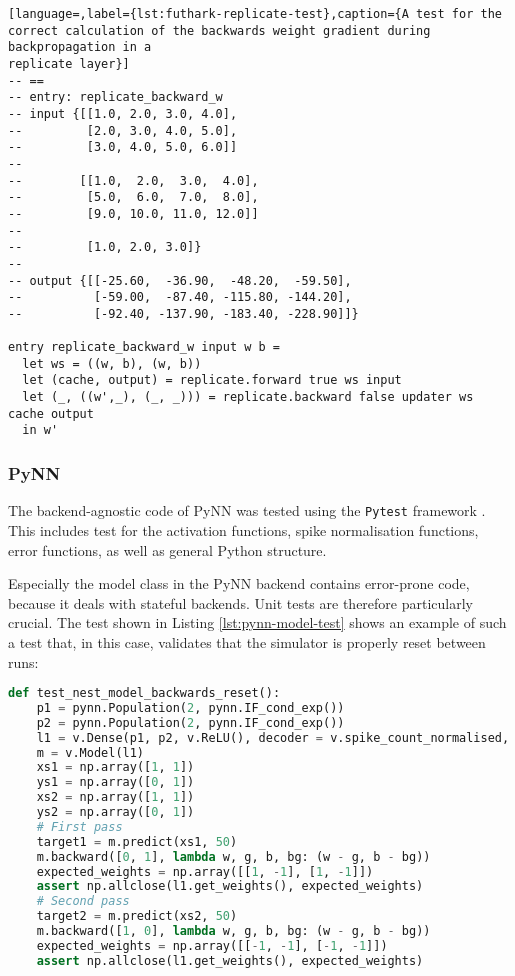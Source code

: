 \begin{minipage}{\linewidth}
\begin{lstlisting}[language=,label={lst:futhark-replicate-test},caption={A test for the
correct calculation of the backwards weight gradient during backpropagation in a
replicate layer}]
-- ==
-- entry: replicate_backward_w
-- input {[[1.0, 2.0, 3.0, 4.0],
--         [2.0, 3.0, 4.0, 5.0],
--         [3.0, 4.0, 5.0, 6.0]]
--
--        [[1.0,  2.0,  3.0,  4.0],
--         [5.0,  6.0,  7.0,  8.0],
--         [9.0, 10.0, 11.0, 12.0]]
--
--         [1.0, 2.0, 3.0]}
--
-- output {[[-25.60,  -36.90,  -48.20,  -59.50],
--          [-59.00,  -87.40, -115.80, -144.20],
--          [-92.40, -137.90, -183.40, -228.90]]}

entry replicate_backward_w input w b =
  let ws = ((w, b), (w, b))
  let (cache, output) = replicate.forward true ws input
  let (_, ((w',_), (_, _))) = replicate.backward false updater ws cache output
  in w'
\end{lstlisting}
\end{minipage}

\subsubsection{PyNN}
The backend-agnostic code of PyNN was tested using the \texttt{Pytest} framework
\cite{Pytest2018}.
This includes test for the activation functions, spike normalisation functions, error functions, 
as well as general Python structure.

Especially the model class in the PyNN backend contains error-prone code, because it
deals with stateful backends.
Unit tests are therefore particularly crucial.
The test shown in Listing \ref{lst:pynn-model-test} shows an example of such a
test that, in this case, validates that the simulator is properly reset between runs:

\begin{lstlisting}[language=Python,label={lst:pynn-model-test},caption={Unit test for
PyNN model to validate that the model correctly updates weights}]
def test_nest_model_backwards_reset():
    p1 = pynn.Population(2, pynn.IF_cond_exp())
    p2 = pynn.Population(2, pynn.IF_cond_exp())
    l1 = v.Dense(p1, p2, v.ReLU(), decoder = v.spike_count_normalised, weights = 1)
    m = v.Model(l1)
    xs1 = np.array([1, 1])
    ys1 = np.array([0, 1])
    xs2 = np.array([1, 1])
    ys2 = np.array([0, 1])
    # First pass
    target1 = m.predict(xs1, 50)
    m.backward([0, 1], lambda w, g, b, bg: (w - g, b - bg))
    expected_weights = np.array([[1, -1], [1, -1]])
    assert np.allclose(l1.get_weights(), expected_weights)
    # Second pass
    target2 = m.predict(xs2, 50)
    m.backward([1, 0], lambda w, g, b, bg: (w - g, b - bg))
    expected_weights = np.array([[-1, -1], [-1, -1]])
    assert np.allclose(l1.get_weights(), expected_weights)
\end{lstlisting}

